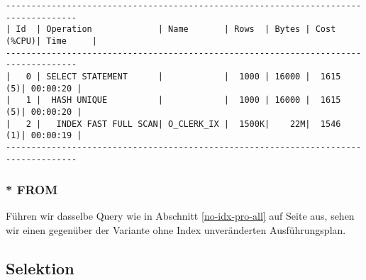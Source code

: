 \documentclass[11pt,a4paper,parskip=half]{scrartcl}
\begin{document}
\begin{lstlisting}
------------------------------------------------------------------------------------                                                                                                                                                                                                                         
| Id  | Operation             | Name       | Rows  | Bytes | Cost (%CPU)| Time     |                                                                                                                                                                                                                         
------------------------------------------------------------------------------------                                                                                                                                                                                                                         
|   0 | SELECT STATEMENT      |            |  1000 | 16000 |  1615   (5)| 00:00:20 |                                                                                                                                                                                                                         
|   1 |  HASH UNIQUE          |            |  1000 | 16000 |  1615   (5)| 00:00:20 |                                                                                                                                                                                                                         
|   2 |   INDEX FAST FULL SCAN| O_CLERK_IX |  1500K|    22M|  1546   (1)| 00:00:19 |                                                                                                                                                                                                                         
------------------------------------------------------------------------------------
\end{lstlisting}

\subsubsection{* FROM}
Führen wir dasselbe Query wie in Abschnitt \ref{no-idx-pro-all} auf Seite \pageref{no-idx-pro-all} aus, sehen wir einen gegenüber der Variante ohne Index unveränderten Ausführungsplan.

\subsection{Selektion}
\end{document}
